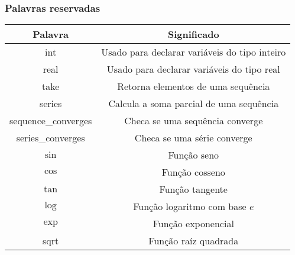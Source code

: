 \documentclass{beamer}
\begin{document}
\begin{frame}[fragile]
  \frametitle{Palavras reservadas}
{\small
\begin{table}[h]
\begin{center}
\begin{tabular}{|c|c|}
\hline
\textbf{Palavra}             & \textbf{Significado}                                                         \\ \hline
int                 & Usado para declarar vari\'aveis do tipo inteiro                     \\ \hline
real                & Usado para declarar vari\'aveis do tipo real                        \\ \hline
take                & Retorna elementos de uma sequ\^encia                \\ \hline
series              & Calcula a soma parcial de uma sequ\^encia           \\ \hline
sequence\_converges & Checa se uma sequ\^encia converge                   \\ \hline
series\_converges   & Checa se uma s\'erie converge                   \\ \hline
$\sin$              & Fun\c c\~ao seno                                                    \\ \hline
$\cos$              & Fun\c c\~ao cosseno                                                 \\ \hline
$\tan$              & Fun\c c\~ao tangente                                                \\ \hline
$\log$              & Fun\c c\~ao logaritmo com base $e$                                  \\ \hline
$\exp$              & Fun\c c\~ao exponencial                                             \\ \hline
sqrt                & Fun\c c\~ao ra\'iz quadrada                                         \\ \hline
\end{tabular}
\end{center}
\end{table}
}
\end{frame}
\end{document}
